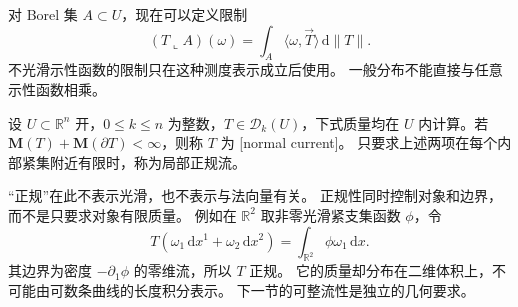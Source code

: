 对 Borel 集 \(A\subset U\)，现在可以定义限制
\[
 (T\llcorner A)(\omega)
       =\int_A\langle\omega,\vec T\rangle\,\mathrm{d}\|T\|.
\]
不光滑示性函数的限制只在这种测度表示成立后使用。
一般分布不能直接与任意示性函数相乘。

\begin{definition}\label{b1:def:app-d-normal-current}
设 \(U\subset\mathbb R^n\) 开，\(0\le k\le n\) 为整数，\(T\in\mathcal D_k(U)\)，下式质量均在 \(U\) 内计算。若 \(\mathbf M(T)+\mathbf M(\partial T)<\infty\)，则称 \(T\) 为%
[normal current]。
只要求上述两项在每个内部紧集附近有限时，称为局部正规流。
\end{definition}

“正规”在此不表示光滑，也不表示与法向量有关。
正规性同时控制对象和边界，而不是只要求对象有限质量。
例如在 \(\mathbb R^2\) 取非零光滑紧支集函数 \(\phi\)，令
\[
 T(\omega_1\,\mathrm{d}x^1+\omega_2\,\mathrm{d}x^2)
      =\int_{\mathbb R^2}\phi\omega_1\,\mathrm{d}x.
\]
其边界为密度 \(-\partial_1\phi\) 的零维流，所以 \(T\) 正规。
它的质量却分布在二维体积上，不可能由可数条曲线的长度积分表示。
下一节的可整流性是独立的几何要求。
